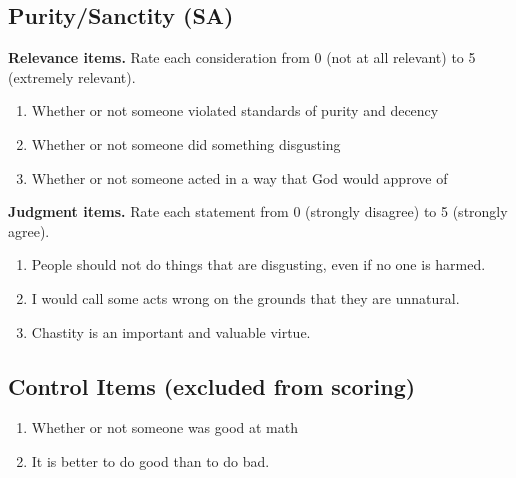 \subsection*{Purity/Sanctity (SA)}
\textbf{Relevance items.} Rate each consideration from 0 (not at all relevant) to 5 (extremely relevant).
\begin{enumerate}
\item[SA25] Whether or not someone violated standards of purity and decency
\item[SA26] Whether or not someone did something disgusting
\item[SA27] Whether or not someone acted in a way that God would approve of
\end{enumerate}
\textbf{Judgment items.} Rate each statement from 0 (strongly disagree) to 5 (strongly agree).
\begin{enumerate}
\item[SA28] People should not do things that are disgusting, even if no one is harmed.
\item[SA29] I would call some acts wrong on the grounds that they are unnatural.
\item[SA30] Chastity is an important and valuable virtue.
\end{enumerate}
\subsection*{Control Items (excluded from scoring)}
\begin{enumerate}
\item[CT31] Whether or not someone was good at math
\item[CT32] It is better to do good than to do bad.
\end{enumerate}
